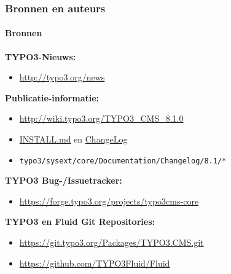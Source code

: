 \begin{frame}[fragile]
	\frametitle{Bronnen en auteurs}
	\framesubtitle{Bronnen}

	\textbf{TYPO3-Nieuws:}
		\begin{itemize}\smaller
			\item \url{http://typo3.org/news}
		\end{itemize}

	\textbf{Publicatie-informatie:}
		\begin{itemize}\smaller
			\item \url{http://wiki.typo3.org/TYPO3_CMS_8.1.0}
			\item \href{https://github.com/TYPO3/TYPO3.CMS/blob/master/INSTALL.md}{INSTALL.md}
				en \href{https://github.com/TYPO3/TYPO3.CMS/tree/master/typo3/sysext/core/Documentation/Changelog}{ChangeLog}
			\item \texttt{typo3/sysext/core/Documentation/Changelog/8.1/*}
		\end{itemize}

	\textbf{TYPO3 Bug-/Issuetracker:}
		\begin{itemize}\smaller
			\item \url{https://forge.typo3.org/projects/typo3cms-core}
		\end{itemize}

	\textbf{TYPO3 en Fluid Git Repositories:}
		\begin{itemize}\smaller
			\item \url{https://git.typo3.org/Packages/TYPO3.CMS.git}
			\item \url{https://github.com/TYPO3Fluid/Fluid}
		\end{itemize}

\end{frame}


